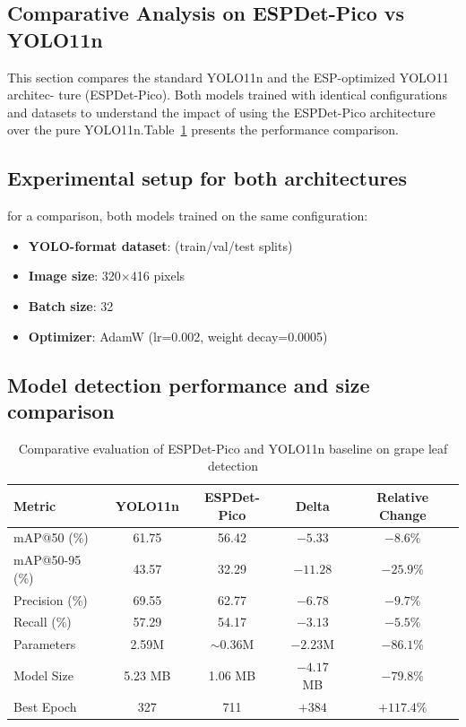 \subsection{Comparative Analysis on ESPDet-Pico vs YOLO11n}
This section compares the standard YOLO11n and the ESP-optimized YOLO11 architec-
ture (ESPDet-Pico). Both models trained with identical configurations and datasets to understand the impact of using the ESPDet-Pico architecture over the pure YOLO11n.Table~\ref{tab:espdet_vs_yolo11n} presents the performance comparison.


\subsection*{Experimental setup for both architectures }

for a comparison, both models trained on the same configuration:
\begin{itemize}
    \item \textbf{YOLO-format dataset}: (train/val/test splits)
    \item \textbf{Image size}: 320$\times$416 pixels 
    \item \textbf{Batch size}: 32
    \item \textbf{Optimizer}: AdamW (lr=0.002, weight decay=0.0005)
\end{itemize}

\subsection*{Model detection performance and size comparison}

\begin{table}[htbp]
\centering
\caption{Comparative evaluation of ESPDet-Pico and YOLO11n baseline on grape leaf detection}
\label{tab:espdet_vs_yolo11n}
\begin{tabular}{lcccc}
\toprule
\textbf{Metric}             & \textbf{YOLO11n} & \textbf{ESPDet-Pico} & \textbf{Delta} & \textbf{Relative Change} \\
\midrule
mAP@50 (\%)                 & 61.75            & 56.42                & $-5.33$        & $-8.6\%$                 \\
mAP@50-95 (\%)              & 43.57            & 32.29                & $-11.28$       & $-25.9\%$                \\
Precision (\%)              & 69.55            & 62.77                & $-6.78$        & $-9.7\%$                 \\
Recall (\%)                 & 57.29            & 54.17                & $-3.13$        & $-5.5\%$                 \\
\midrule
Parameters                  & 2.59M            & $\sim$0.36M          & $-2.23$M       & $-86.1\%$                \\
Model Size           & 5.23 MB          & 1.06 MB              & $-4.17$ MB     & $-79.8\%$                \\
Best Epoch                  & 327              & 711                  & $+384$         & $+117.4\%$               \\
\bottomrule
\end{tabular}
\end{table}

